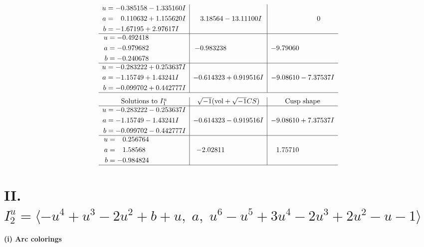 \documentclass[1p]{elsarticle_modified}
\theoremstyle{definition}
\newcommand{\I}{\sqrt{-1}}
\begin{document}
$$\begin{array}{c|c|c}
\begin{aligned}
u &= -0.385158 - 1.335160 I \\
a &= \phantom{-}0.110632 + 1.155620 I \\
b &= -1.67195 + 2.97617 I\end{aligned}
 & \phantom{-}3.18564 - 13.11100 I & \phantom{-0.000000 } 0 \\ \hline\begin{aligned}
u &= -0.492418\phantom{ +0.000000I} \\
a &= -0.979682\phantom{ +0.000000I} \\
b &= -0.240678\phantom{ +0.000000I}\end{aligned}
 & -0.983238\phantom{ +0.000000I} & -9.79060\phantom{ +0.000000I} \\ \hline\begin{aligned}
u &= -0.283222 + 0.253637 I \\
a &= -1.15749 + 1.43241 I \\
b &= -0.099702 + 0.442777 I\end{aligned}
 & -0.614323 + 0.919516 I & -9.08610 - 7.37537 I\\
 \hline 
 \end{array}$$\newpage$$\begin{array}{c|c|c}  
\text{Solutions to }I^u_{1}& \I (\text{vol} + \sqrt{-1}CS) & \text{Cusp shape}\\
 \hline 
\begin{aligned}
u &= -0.283222 - 0.253637 I \\
a &= -1.15749 - 1.43241 I \\
b &= -0.099702 - 0.442777 I\end{aligned}
 & -0.614323 - 0.919516 I & -9.08610 + 7.37537 I \\ \hline\begin{aligned}
u &= \phantom{-}0.256764\phantom{ +0.000000I} \\
a &= \phantom{-}1.58568\phantom{ +0.000000I} \\
b &= -0.984824\phantom{ +0.000000I}\end{aligned}
 & -2.02811\phantom{ +0.000000I} & \phantom{-}1.75710\phantom{ +0.000000I}\\
 \hline 
 \end{array}$$\newpage\newpage\renewcommand{\arraystretch}{1}
\centering \section*{II. $I^u_{2}= \langle - u^4+u^3-2 u^2+b+u,\;a,\;u^6- u^5+3 u^4-2 u^3+2 u^2- u-1 \rangle$}
\flushleft \textbf{(i) Arc colorings}\\
\end{document}
